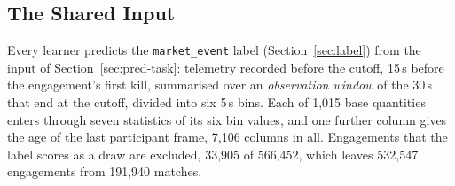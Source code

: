 \subsection{The Shared Input}
\label{sec:learners-input}

Every learner predicts the \texttt{market\_event} label (Section~\ref{sec:label}) from the input of
Section~\ref{sec:pred-task}: telemetry recorded before the cutoff, 15\,s before the engagement's first
kill, summarised over an \emph{observation window} of the 30\,s that end at the cutoff, divided into six
5\,s bins. Each of 1,015 base quantities enters through seven statistics of its six bin values, and one
further column gives the age of the last participant frame, 7,106 columns in all. Engagements that the
label scores as a draw are excluded, 33,905 of 566,452, which leaves 532,547 engagements from 191,940
matches.

